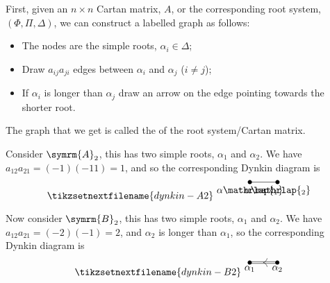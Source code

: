 \documentclass[fleqn]{NotesClass}
\newcommand{\dynkin}[2]{\symrm{#1}_{#2}}
\begin{document}
    First, given an \(n \times n\) Cartan matrix, \(A\), or the corresponding root system, \((\Phi, \Pi, \Delta)\), we can construct a labelled graph as follows:
    \begin{itemize}
        \item The nodes are the simple roots, \(\alpha_i \in \Delta\);
        \item Draw \(a_{ij}a_{ji}\) edges between \(\alpha_i\) and \(\alpha_j\) (\(i \ne j\));
        \item If \(\alpha_i\) is longer than \(\alpha_j\) draw an arrow on the edge pointing towards the shorter root.
    \end{itemize}
    The graph that we get is called the  of the root system/Cartan matrix.
    
    \begin{exm}{}{}
        Consider \(\dynkin{A}{2}\), this has two simple roots, \(\alpha_1\) and \(\alpha_2\).
        We have \(a_{12} a_{21} = (-1) (-11) = 1\), and so the corresponding Dynkin diagram is
        \begin{equation}
            \tikzsetnextfilename{dynkin-A2}
            \begin{tikzpicture}
                \fill (0, 0) circle [radius=0.075cm] node [below] {\(\alpha\mathrlap{_1}\)};
                \fill (1, 0) circle [radius=0.075cm] node [below] {\(\alpha\mathrlap{_2}\)};
                \draw (0, 0) -- (1, 0);
            \end{tikzpicture}
        \end{equation}
        
        Now consider \(\dynkin{B}{2}\), this has two simple roots, \(\alpha_1\) and \(\alpha_2\).
        We have \(a_{12} a_{21} = (-2)(-1) = 2\), and \(\alpha_2\) is longer than \(\alpha_1\), so the corresponding Dynkin diagram is
        \begin{equation}
            \tikzsetnextfilename{dynkin-B2}
            \begin{tikzpicture}
                \fill (0, 0) circle [radius=0.075cm] node [below] {\(\alpha_1\)};
                \fill (1, 0) circle [radius=0.075cm] node [below] {\(\alpha_2\)};
                \draw (0, 0.03) -- ++ (1, 0);
                \draw (0, -0.03) -- ++ (1, 0);
                \draw [-{>[length=1.5mm,width=3mm]}, xshift=0.49cm] (0, 0) -- ++ (-0.001, 0);
            \end{tikzpicture}
        \end{equation}
    \end{exm}
    
\end{document}

